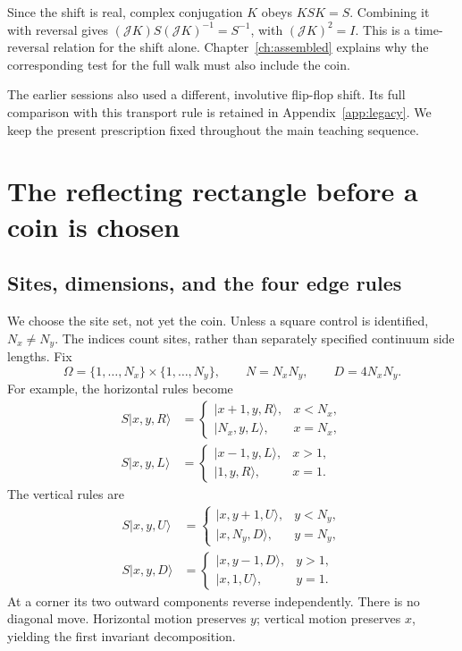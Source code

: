 \documentclass[11pt,a4paper,oneside]{report}
\newcommand{\ket}[1]{\lvert #1\rangle}
\newcommand{\Id}{I}
\numberwithin{equation}{chapter}
\begin{document}
Since the shift is real, complex conjugation \(K\) obeys \(KSK=S\).
Combining it with reversal gives
\((\mathcal J K)S(\mathcal J K)^{-1}=S^{-1}\), with
\((\mathcal J K)^2=\Id\). This is a time-reversal relation for the
shift alone. Chapter~\ref{ch:assembled} explains why the corresponding
test for the full walk must also include the coin.

The earlier sessions also used a different, involutive flip-flop shift.
Its full comparison with this transport rule is retained in
Appendix~\ref{app:legacy}. We keep the present prescription fixed
throughout the main teaching sequence.

\chapter{The reflecting rectangle before a coin is chosen}
\label{ch:rectangle}

\section{Sites, dimensions, and the four edge rules}

We choose the site set, not yet the coin. Unless a square control
is identified, \(N_x\ne N_y\). The indices count sites, rather than
separately specified continuum side lengths. Fix
\begin{equation}
\Omega=\{1,\ldots,N_x\}\times\{1,\ldots,N_y\},\qquad
N=N_xN_y,\qquad D=4N_xN_y.
\end{equation}
For example, the horizontal rules become
\begin{align}
S\ket{x,y,R}&=
\begin{cases}\ket{x+1,y,R},&x<N_x,\\\ket{N_x,y,L},&x=N_x,\end{cases}\\
S\ket{x,y,L}&=
\begin{cases}\ket{x-1,y,L},&x>1,\\\ket{1,y,R},&x=1.\end{cases}
\end{align}
The vertical rules are
\begin{align}
S\ket{x,y,U}&=\begin{cases}\ket{x,y+1,U},&y<N_y,\\\ket{x,N_y,D},&y=N_y,\end{cases}\\
S\ket{x,y,D}&=\begin{cases}\ket{x,y-1,D},&y>1,\\\ket{x,1,U},&y=1.\end{cases}
\end{align}
At a corner its two outward components reverse independently.
There is no diagonal move. Horizontal motion preserves \(y\);
vertical motion preserves \(x\), yielding the first invariant
decomposition.
\end{document}
